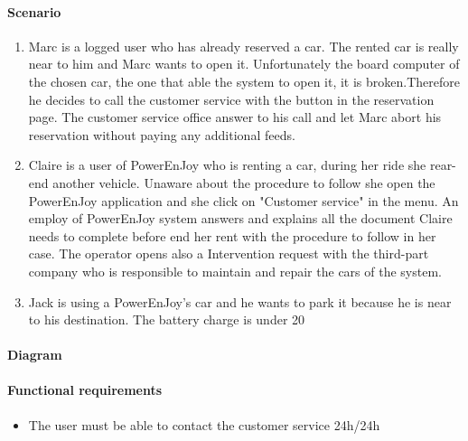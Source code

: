 \paragraph{Scenario}
\begin{enumerate}
	\item Marc is a logged user who has already reserved a car. The rented car is really near to him and Marc wants to open it. Unfortunately the board computer of the chosen car, the one that able the system to open it, it is broken.Therefore he decides to call the customer service with the button in the reservation page. The customer service office answer to his call and let Marc abort his reservation without paying any additional feeds.
	\item Claire is a user of PowerEnJoy who is renting a car, during her ride she rear-end another vehicle. Unaware about the procedure to follow she open the PowerEnJoy application and she click on "Customer service" in the menu. An employ of PowerEnJoy system answers and explains all the document Claire needs to complete before end her rent with the procedure to follow in her case. The operator opens also a Intervention request with the third-part company who is responsible to maintain and repair the cars of the system.
	\item Jack is using a PowerEnJoy's car and he wants to park it because he is near to his destination. The battery charge is under 20%
\end{enumerate}
\paragraph{Diagram}
\paragraph {Functional requirements }
\begin{itemize}
	\item The user must be able to contact the customer service 24h/24h
\end{itemize}

